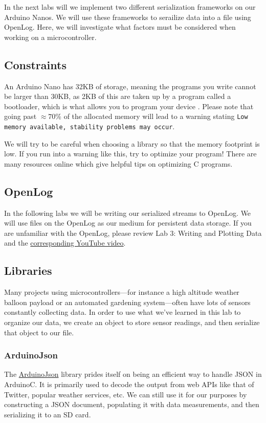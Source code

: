 In the next labs will we implement two different serialization frameworks on our Arduino Nanos. We will use these frameworks to serailize data into a file using OpenLog. Here, we will investigate what factors must be considered when working on a microcontroller. 

\subsection{Constraints}
An Arduino Nano has 32KB of storage, meaning the programs you write cannot be larger than 30KB, as 2KB of this are taken up by a program called a bootloader, which is what allows you to program your device \cite{arduino_nano_specs}. Please note that going past $\approx 70$\% of the allocated memory will lead to a warning stating \texttt{Low memory available, stability problems may occur}. 

We will try to be careful when choosing a library so that the memory footprint is low. If you run into a warning like this, try to optimize your program! There are many resources online which give helpful tips on optimizing C programs.  

\subsection{OpenLog}
In the following labs we will be writing our serialized streams to OpenLog. We will use files on the OpenLog as our medium for persistent data storage. If you are unfamiliar with the OpenLog, please review Lab 3:  Writing and Plotting Data and the \href{https://www.youtube.com/watch?v=FhgAi-ju6Z4}{corresponding YouTube video}.

\subsection{Libraries}
Many projects using microcontrollers—for instance a high altitude weather balloon payload or an automated gardening system—often have lots of sensors constantly collecting data. In order to use what we've learned in this lab to organize our data, we create an object to store sensor readings, and then serialize that object to our file. 

\subsubsection{ArduinoJson}
The \href{https://arduinojson.org/}{ArduinoJson} library prides itself on being an efficient way to handle JSON in ArduinoC. It is primarily used to decode the output from web APIs like that of Twitter, popular weather services, etc. We can still use it for our purposes by constructing a JSON document, populating it with data measurements, and then serializing it to an SD card. 

